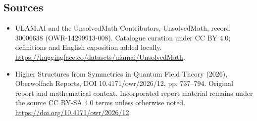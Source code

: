 \documentclass[11pt]{article}
\begin{document}
\subsection{Sources}
\begin{itemize}
\item[\hypertarget{source:30006638:1}{S1}] ULAM.AI and the UnsolvedMath Contributors, UnsolvedMath, record 30006638 (OWR-14299913-008). Catalogue curation under CC BY 4.0; definitions and English exposition added locally.
\url{https://huggingface.co/datasets/ulamai/UnsolvedMath}.
\item[\hypertarget{source:30006638:2}{S2}] Higher Structures from Symmetries in Quantum Field Theory (2026), Oberwolfach Reports, DOI 10.4171/owr/2026/12, pp. 737--794. Original report and mathematical context. Incorporated report material remains under the source CC BY-SA 4.0 terms unless otherwise noted.
\url{https://doi.org/10.4171/owr/2026/12}.
\end{itemize}
\label{end:30006638}
\end{document}
